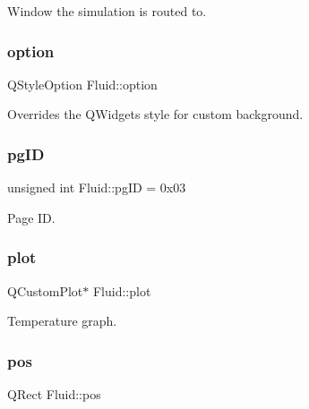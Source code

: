 Window the simulation is routed to. 

\mbox{\label{classFluid_afcdad9ca2270eca892ebe19cc6eb0792}} 
\subsubsection{\texorpdfstring{option}{option}}
{\footnotesize\ttfamily Q\+Style\+Option Fluid\+::option\hspace{0.3cm}{\ttfamily [private]}}



Overrides the Q\+Widget\textquotesingle{}s style for custom background. 

\mbox{\label{classFluid_a6a918fd3756b078ac094010cf5215f90}} 
\subsubsection{\texorpdfstring{pgID}{pgID}}
{\footnotesize\ttfamily unsigned int Fluid\+::pg\+ID = 0x03}



Page ID. 

\mbox{\label{classFluid_aa996761644ea1e220176f4983569bd4b}} 
\subsubsection{\texorpdfstring{plot}{plot}}
{\footnotesize\ttfamily Q\+Custom\+Plot$\ast$ Fluid\+::plot\hspace{0.3cm}{\ttfamily [private]}}



Temperature graph. 

\mbox{\label{classFluid_acc8b08224f3d6ee3a6d662c27562e1ab}} 
\subsubsection{\texorpdfstring{pos}{pos}}
{\footnotesize\ttfamily Q\+Rect Fluid\+::pos\hspace{0.3cm}{\ttfamily [private]}}



